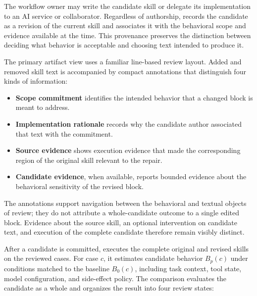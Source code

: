 The workflow owner may write the candidate skill or delegate its
implementation to an AI service or collaborator. Regardless of authorship,
\systemname{} records the candidate as a revision of the current skill and
associates it with the behavioral scope and evidence available at the time.
This provenance preserves the distinction between deciding what behavior is
acceptable and choosing text intended to produce it.

The primary artifact view uses a familiar line-based review layout. Added and
removed skill text is accompanied by compact annotations that distinguish four
kinds of information:

\begin{itemize}[leftmargin=*]
    \item \textbf{Scope commitment} identifies the intended behavior that a
    changed block is meant to address.
    \item \textbf{Implementation rationale} records why the candidate author
    associated that text with the commitment.
    \item \textbf{Source evidence} shows execution evidence that made the
    corresponding region of the original skill relevant to the repair.
    \item \textbf{Candidate evidence}, when available, reports bounded
    evidence about the behavioral sensitivity of the revised block.
\end{itemize}

The annotations support navigation between the behavioral and textual objects
of review; they do not attribute a whole-candidate outcome to a single edited
block. Evidence about the source skill, an optional intervention on candidate
text, and execution of the complete candidate therefore remain visibly
distinct.

After a candidate is committed, \systemname{} executes the complete original
and revised skills on the reviewed cases. For case $c$, it estimates candidate
behavior $B_p(c)$ under conditions matched to the baseline $B_0(c)$, including
task context, tool state, model configuration, and side-effect policy. The
comparison evaluates the candidate as a whole and organizes the result into
four review states:

